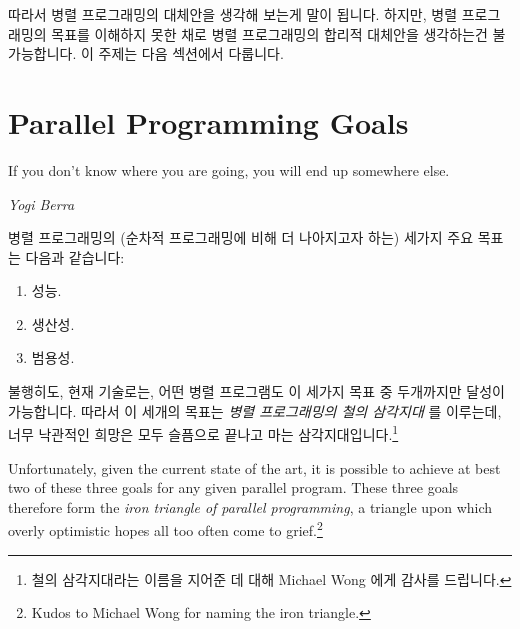 따라서 병렬 프로그래밍의 대체안을 생각해 보는게 말이 됩니다.
하지만, 병렬 프로그래밍의 목표를 이해하지 못한 채로 병렬 프로그래밍의 합리적
대체안을 생각하는건 불가능합니다.
이 주제는 다음 섹션에서 다룹니다.

\section{Parallel Programming Goals}
\label{sec:intro:Parallel Programming Goals}
%
\epigraph{If you don't know where you are going, you will end up somewhere
	  else.}{\emph{Yogi Berra}}

병렬 프로그래밍의 (순차적 프로그래밍에 비해 더 나아지고자 하는) 세가지 주요
목표는 다음과 같습니다:

\begin{enumerate}
\item	성능.
\item	생산성.
\item	범용성.
\end{enumerate}

불행히도, 현재 기술로는, 어떤 병렬 프로그램도 이 세가지 목표 중 두개까지만
달성이 가능합니다.
따라서 이 세개의 목표는 \emph{병렬 프로그래밍의 철의 삼각지대} 를 이루는데,
너무 낙관적인 희망은 모두 슬픔으로 끝나고 마는 삼각지대입니다.\footnote{
	철의 삼각지대라는 이름을 지어준 데 대해 Michael Wong 에게 감사를
	드립니다.}

\iffalse

Unfortunately, given the current state of the art, it is possible to
achieve at best two of these three goals for any given parallel program.
These three goals therefore form the \emph{iron triangle of parallel
programming},
a triangle upon which overly optimistic hopes all too often come to
grief.\footnote{
	Kudos to Michael Wong for naming the iron triangle.}

